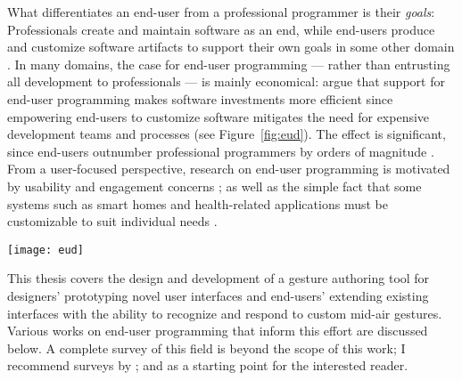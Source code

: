 What differentiates an end-user from a professional programmer is their \emph{goals}: Professionals create and maintain software as an end, while end-users produce and customize software artifacts to support their own goals in some other domain \parencite{Ko:2011}. In many domains, the case for end-user programming --- rather than entrusting all development to professionals --- is mainly economical:  \textcite{Wulf:2004} argue that support for end-user programming makes software investments more efficient since empowering end-users to customize software mitigates the need for expensive development teams and processes (see Figure~\ref{fig:eud}). The effect is significant, since end-users outnumber professional programmers by orders of magnitude \parencite{Scaffidi:2005}. From a user-focused perspective, research on end-user programming is motivated by usability and engagement concerns \parencite{Germonprez:2007}; as well as the simple fact that some systems such as smart homes \parencite{Blackwell:2004} and health-related applications \parencite{Rizzo:2011, Lange:2011} must be customizable to suit individual needs \parencite{Holloway:2010}.

\begin{SCfigure}[\sidecaptionrelwidth][ht]
\centering
\texttt{[image: eud]}
\caption{Comparing the cost structure for software development, adaptation and appropriation with and without end-user programming support. Adapted from \textcite{Wulf:2004}.}
\label{fig:eud}
\end{SCfigure}

This thesis covers the design and development of a gesture authoring tool for designers' prototyping novel user interfaces and end-users' extending existing interfaces with the ability to recognize and respond to custom mid-air gestures. Various works on end-user programming that inform this effort are discussed below. A complete survey of this field is beyond the scope of this work; I recommend surveys by \textcite{Paterno:2013}; and \textcite{Myers:2006} as a starting point for the interested reader.



